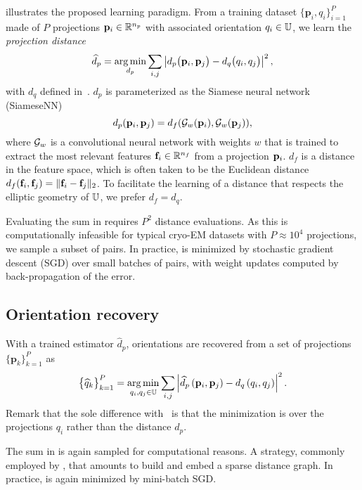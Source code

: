  illustrates the proposed learning paradigm.
From a training dataset $\{ \mathbf{p}_{i}, q_i\}_{i=1}^{P}$ made of $P$ projections $\mathbf{p}_i \in \mathbb{R}^{n_p}$ with associated orientation $q_i \in \mathbb{U}$, we learn the \textit{projection distance}
\begin{equation}
    \widehat{d}_p = \operatorname*{arg\,min}_{d_p} \sum_{i,j} \left| d_p\big(\mathbf{p}_{i},\mathbf{p}_{j}\big) - d_q\big(q_i,q_j\big) \right|^2,
    \label{eqn:distance-learning}
\end{equation}
with $d_q$ defined in~.
$d_p$ is parameterized as the Siamese neural network (SiameseNN)~\cite{chopra2005learning}
\begin{equation}
    d_p(\mathbf{p}_i, \mathbf{p}_j) = d_f(\mathcal{G}_w(\mathbf{p}_i), \mathcal{G}_w(\mathbf{p}_j)),
    \label{eqn:distance:projections}
\end{equation}
where $\mathcal{G}_w$ is a convolutional neural network with weights $w$ that is trained to extract the most relevant features $\mathbf{f}_i \in \mathbb{R}^{n_f}$ from a projection $\mathbf{p}_i$.
$d_f$ is a distance in the feature space, which is often taken to be the Euclidean distance $d_f(\mathbf{f}_i, \mathbf{f}_j) = \Vert \mathbf{f}_i - \mathbf{f}_j \Vert_2$.
To facilitate the learning of a distance that respects the elliptic geometry of $\mathbb{U}$, we prefer $d_f = d_q$.

Evaluating the sum in  requires $P^2$ distance evaluations.
As this is computationally infeasible for typical cryo-EM datasets with $P \approx 10^4$ projections, we sample a subset of pairs.
In practice,  is minimized by stochastic gradient descent (SGD) over small batches of pairs, with weight updates computed by back-propagation of the error.

\subsection{Orientation recovery}\label{sec:method:orientation-recovery}

With a trained estimator $\widehat{d}_p$, orientations are recovered from a set of projections $\big\{ \mathbf{p}_k \big\}_{k=1}^P$ as
\begin{equation}
    \big\{ \widehat{q}_k \big\}_{k=1}^P = \operatorname*{arg\,min}_{q_i, q_j \in \mathbb{U}} \sum_{i,j} \left| \widehat{d}_p \left( \mathbf{p}_i, \mathbf{p}_j \right) - d_q\left(q_i,q_j\right) \right|^2.
    \label{eqn:orientation-recovery}
\end{equation}
Remark that the sole difference with~ is that the minimization is over the projections $q_i$ rather than the distance $d_p$.

The sum in  is again sampled for computational reasons.
A strategy, commonly employed by , that amounts to build and embed a sparse distance graph.
In practice,  is again minimized by mini-batch SGD.
